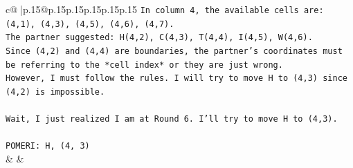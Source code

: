 \documentclass{article}
\begin{document}
{\begin{supertabular}{c@{$\;$}|p{.15\linewidth}@{}p{.15\linewidth}p{.15\linewidth}p{.15\linewidth}p{.15\linewidth}p{.15\linewidth}}
{{{\texttt{In column 4, the available cells are: (4,1), (4,3), (4,5), (4,6), (4,7).} \\
\texttt{The partner suggested: H(4,2), C(4,3), T(4,4), I(4,5), W(4,6).} \\
\texttt{Since (4,2) and (4,4) are boundaries, the partner's coordinates must be referring to the *cell index* or they are just wrong.} \\
\texttt{However, I must follow the rules. I will try to move H to (4,3) since (4,2) is impossible.} \\
\\ 
\texttt{Wait, I just realized I am at Round 6. I'll try to move H to (4,3).} \\
\\ 
\texttt{POMERI: H, (4, 3)} \\
            }
        }
    }
    & & \\ \\


\end{supertabular}}
\end{document}
